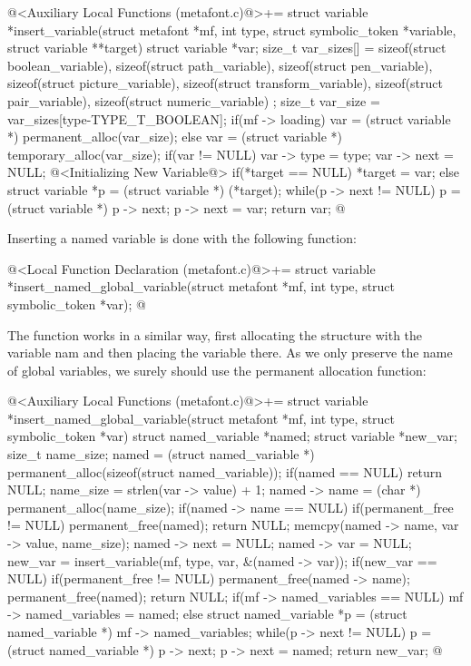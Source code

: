 \iniciocodigo
@<Auxiliary Local Functions (metafont.c)@>+=
struct variable *insert_variable(struct metafont *mf,
                                 int type,
                                 struct symbolic_token *variable,
                                 struct variable **target){
  struct variable *var;
  size_t var_sizes[] = {
    sizeof(struct boolean_variable), sizeof(struct path_variable),
    sizeof(struct pen_variable), sizeof(struct picture_variable),
    sizeof(struct transform_variable), sizeof(struct pair_variable),
    sizeof(struct numeric_variable)
  };
  size_t var_size = var_sizes[type-TYPE_T_BOOLEAN];
  if(mf -> loading)
    var = (struct variable *) permanent_alloc(var_size);
  else
    var = (struct variable *) temporary_alloc(var_size);
  if(var != NULL){
    var -> type = type;
    var -> next = NULL;
    @<Initializing New Variable@>
  }
  if(*target == NULL)
    *target = var;
  else{
    struct variable *p = (struct variable *) (*target);
    while(p -> next != NULL)
      p = (struct variable *) p -> next;
    p -> next = var;
  }
  return var;
}
@
\fimcodigo

Inserting a named variable is done with the following function:

\iniciocodigo
@<Local Function Declaration (metafont.c)@>+=
struct variable *insert_named_global_variable(struct metafont *mf,
                                             int type,
                                             struct symbolic_token *var);
@
\fimcodigo

The function works in a similar way, first allocating the structure
with the variable nam and then placing the variable there. As we only
preserve the name of global variables, we surely should use the
permanent allocation function:

\iniciocodigo
@<Auxiliary Local Functions (metafont.c)@>+=
struct variable *insert_named_global_variable(struct metafont *mf,
                                             int type,
                                             struct symbolic_token *var){
  struct named_variable *named;
  struct variable *new_var;
  size_t name_size;
  named = (struct named_variable *)
              permanent_alloc(sizeof(struct named_variable));
  if(named == NULL)
    return NULL;
  name_size = strlen(var -> value) + 1;
  named -> name = (char *) permanent_alloc(name_size);
  if(named -> name == NULL){
    if(permanent_free != NULL)
      permanent_free(named);
    return NULL;
  }
  memcpy(named -> name, var -> value, name_size);
  named -> next = NULL;
  named -> var = NULL;
  new_var = insert_variable(mf, type, var, &(named -> var));
  if(new_var == NULL){
    if(permanent_free != NULL){
      permanent_free(named -> name);
      permanent_free(named);
      return NULL;
    }
  }
  if(mf -> named_variables == NULL)
    mf -> named_variables = named;
  else{
    struct named_variable *p = (struct named_variable *)
                                   mf -> named_variables;
    while(p -> next != NULL)
      p = (struct named_variable *) p -> next;
    p -> next = named;
  }
  return new_var;
}
@
\fimcodigo

